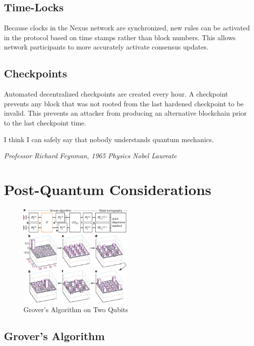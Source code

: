 \documentclass[11pt]{article}
\begin{document}
\subsection{Time-Locks}

Because clocks in the Nexus network are synchronized, new rules can be activated in the protocol based on time stamps rather than block numbers.
This allows network participants to more accurately activate consensus updates.

\subsection{Checkpoints}

Automated decentralized checkpoints are created every hour.
A checkpoint prevents any block that was not rooted from the last hardened checkpoint to be invalid.
This prevents an attacker from producing an alternative blockchain prior to the last checkpoint time.

\bigskip
\epigraph{I think I can safely say that nobody understands quantum mechanics.}{\textit{\footnotesize{Professor Richard Feynman, 1965 Physics Nobel Laureate \cite{nobelfeynman}}}}

\pagebreak
\section{Post-Quantum Considerations}

\begin{figure} %
	\vspace{-35pt}
    \centering
    \includegraphics[width=0.50\textwidth]{grovers.jpg}
    \caption{Grover's Algorithm on Two Qubits}
\end{figure}

\subsection{Grover's Algorithm}
\end{document}
